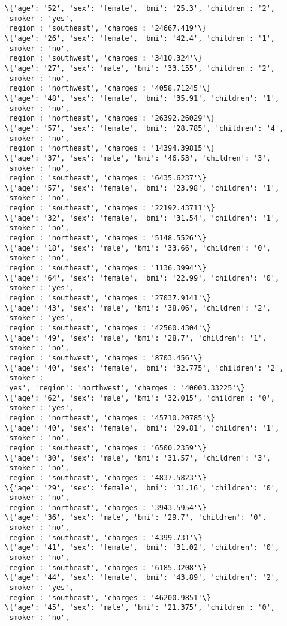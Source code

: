 \documentclass[11pt]{article}
\begin{document}
\begin{Verbatim}[commandchars=\\\{\}]
\{'age': '52', 'sex': 'female', 'bmi': '25.3', 'children': '2', 'smoker': 'yes',
'region': 'southeast', 'charges': '24667.419'\}
\{'age': '26', 'sex': 'female', 'bmi': '42.4', 'children': '1', 'smoker': 'no',
'region': 'southwest', 'charges': '3410.324'\}
\{'age': '27', 'sex': 'male', 'bmi': '33.155', 'children': '2', 'smoker': 'no',
'region': 'northwest', 'charges': '4058.71245'\}
\{'age': '48', 'sex': 'female', 'bmi': '35.91', 'children': '1', 'smoker': 'no',
'region': 'northeast', 'charges': '26392.26029'\}
\{'age': '57', 'sex': 'female', 'bmi': '28.785', 'children': '4', 'smoker': 'no',
'region': 'northeast', 'charges': '14394.39815'\}
\{'age': '37', 'sex': 'male', 'bmi': '46.53', 'children': '3', 'smoker': 'no',
'region': 'southeast', 'charges': '6435.6237'\}
\{'age': '57', 'sex': 'female', 'bmi': '23.98', 'children': '1', 'smoker': 'no',
'region': 'southeast', 'charges': '22192.43711'\}
\{'age': '32', 'sex': 'female', 'bmi': '31.54', 'children': '1', 'smoker': 'no',
'region': 'northeast', 'charges': '5148.5526'\}
\{'age': '18', 'sex': 'male', 'bmi': '33.66', 'children': '0', 'smoker': 'no',
'region': 'southeast', 'charges': '1136.3994'\}
\{'age': '64', 'sex': 'female', 'bmi': '22.99', 'children': '0', 'smoker': 'yes',
'region': 'southeast', 'charges': '27037.9141'\}
\{'age': '43', 'sex': 'male', 'bmi': '38.06', 'children': '2', 'smoker': 'yes',
'region': 'southeast', 'charges': '42560.4304'\}
\{'age': '49', 'sex': 'male', 'bmi': '28.7', 'children': '1', 'smoker': 'no',
'region': 'southwest', 'charges': '8703.456'\}
\{'age': '40', 'sex': 'female', 'bmi': '32.775', 'children': '2', 'smoker':
'yes', 'region': 'northwest', 'charges': '40003.33225'\}
\{'age': '62', 'sex': 'male', 'bmi': '32.015', 'children': '0', 'smoker': 'yes',
'region': 'northeast', 'charges': '45710.20785'\}
\{'age': '40', 'sex': 'female', 'bmi': '29.81', 'children': '1', 'smoker': 'no',
'region': 'southeast', 'charges': '6500.2359'\}
\{'age': '30', 'sex': 'male', 'bmi': '31.57', 'children': '3', 'smoker': 'no',
'region': 'southeast', 'charges': '4837.5823'\}
\{'age': '29', 'sex': 'female', 'bmi': '31.16', 'children': '0', 'smoker': 'no',
'region': 'northeast', 'charges': '3943.5954'\}
\{'age': '36', 'sex': 'male', 'bmi': '29.7', 'children': '0', 'smoker': 'no',
'region': 'southeast', 'charges': '4399.731'\}
\{'age': '41', 'sex': 'female', 'bmi': '31.02', 'children': '0', 'smoker': 'no',
'region': 'southeast', 'charges': '6185.3208'\}
\{'age': '44', 'sex': 'female', 'bmi': '43.89', 'children': '2', 'smoker': 'yes',
'region': 'southeast', 'charges': '46200.9851'\}
\{'age': '45', 'sex': 'male', 'bmi': '21.375', 'children': '0', 'smoker': 'no',

\end{Verbatim}
\end{document}
